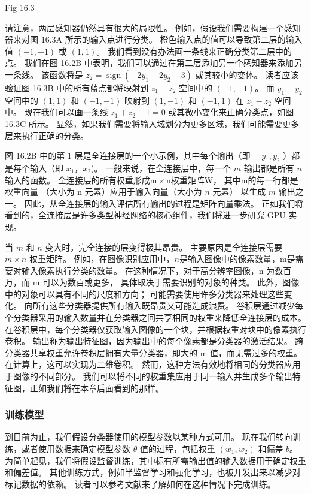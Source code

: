 {\color{red} Fig 16.3}

请注意，两层感知器仍然具有很大的局限性。 例如，假设我们需要构建一个感知器来对图 16.3A 所示的输入点进行分类。 
橙色输入点的值可以导致第二层的输入值 $(-1,-1)$ 或 $(1,1)$。 我们看到没有办法画一条线来正确分类第二层中的点。 
我们在图 16.2B 中表明，我们可以通过在第二层添加另一个感知器来添加另一条线。 
该函数将是 $z_{2}=\operatorname{sign}\left(-2 y_{1}-2 y_{2}-3\right)$ 或其较小的变体。 
读者应该验证图 16.3B 中的所有蓝点都将映射到 $z_{1}-z_{2}$ 空间中的 $(-1,-1)$。 
而 $y_{1}-y_{2}$ 空间中的 $(1,1)$ 和 $(-1,-1)$ 映射到 $(1,-1)$ 和 $(-1,1 )$ 在 $z_{1}-z_{2}$ 空间中。 
现在我们可以画一条线 $z_{1}+z_{2}+1=0$ 或其微小变化来正确分类点，如图 16.3C 所示。 
显然，如果我们需要将输入域划分为更多区域，我们可能需要更多层来执行正确的分类。

图 16.2B 中的第 1 层是全连接层的一个小示例，其中每个输出（即 $\quad y_{1}, y_{2}$ ）都是每个输入（即 $x_{ 1}，x_{2}$)。 
一般来说，在全连接层中，每一个 $m$ 输出都是所有 $n$ 输入的函数。 
全连接层的所有权重形成$\mathrm{m} \times \mathrm{n}$权重矩阵$\mathrm{W}$，
其中$\mathrm{m}$的每一行都是权重向量 （大小为 $\mathrm{n}$ 元素）应用于输入向量（大小为 $n$ 元素）
以生成 $m$ 输出之一。 因此，从全连接层的输入评估所有输出的过程是矩阵向量乘法。 
正如我们将看到的，全连接层是许多类型神经网络的核心组件，我们将进一步研究 GPU 实现。

当 $m$ 和 $n$ 变大时，完全连接的层变得极其昂贵。 主要原因是全连接层需要 $m \times n$ 权重矩阵。 
例如，在图像识别应用中，$n$是输入图像中的像素数量，$\mathrm{m}$是需要对输入像素执行分类的数量。 
在这种情况下，对于高分辨率图像，$\mathrm{n}$ 为数百万，而 $\mathrm{m}$ 可以为数百或更多，
具体取决于需要识别的对象的种类。 此外，图像中的对象可以具有不同的尺度和方向； 可能需要使用许多分类器来处理这些变化。 
向所有这些分类器提供所有输入既昂贵又可能造成浪费。 
卷积层通过减少每个分类器采用的输入数量并在分类器之间共享相同的权重来降低全连接层的成本。 
在卷积层中，每个分类器仅获取输入图像的一个块，并根据权重对块中的像素执行卷积。 
输出称为输出特征图，因为输出中的每个像素都是分类器的激活结果。 
跨分类器共享权重允许卷积层拥有大量分类器，即大的 $\mathrm{m}$ 值，而无需过多的权重。 
在计算上，这可以实现为二维卷积。 然而，这种方法有效地将相同的分类器应用于图像的不同部分。 
我们可以将不同的权重集应用于同一输入并生成多个输出特征图，正如我们将在本章后面看到的那样。

\subsubsection{训练模型}
到目前为止，我们假设分类器使用的模型参数以某种方式可用。 
现在我们转向训练，或者使用数据来确定模型参数 $\theta$ 值的过程，包括权重 $\left(w_{1}, w_{2}\right)$ 和偏差 $b $。 
为简单起见，我们将假设监督训练，其中标有所需输出值的输入数据用于确定权重和偏差值。 
其他训练方式，例如半监督学习和强化学习，也被开发出来以减少对标记数据的依赖。 
读者可以参考文献来了解如何在这种情况下完成训练。

